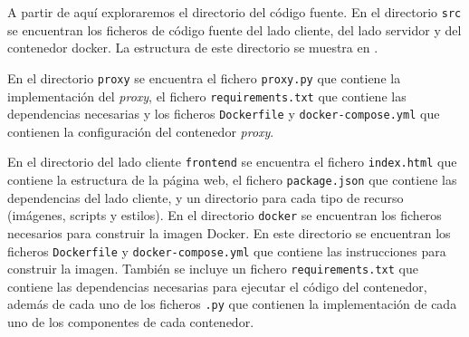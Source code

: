 A partir de aquí exploraremos el directorio del \gls{código fuente}. En el directorio \texttt{src} se encuentran los ficheros de \gls{código fuente} del lado cliente, del lado servidor y del \gls{contenedor} docker. La estructura de este directorio se muestra en .

\begin{figure}[htb]
    {
    \begin{tcolorbox}
    \end{tcolorbox}
    }
\end{figure}
En el directorio \texttt{proxy} se encuentra el fichero \texttt{proxy.py} que contiene la implementación del \textit{\gls{proxy}}, el fichero \texttt{requirements.txt} que contiene las dependencias necesarias y los ficheros \texttt{Dockerfile} y \texttt{docker-compose.yml} que contienen la configuración del \gls{contenedor} \textit{\gls{proxy}}.

En el directorio del lado cliente \texttt{frontend} se encuentra el fichero \texttt{index.html} que contiene la estructura de la página web, el fichero \texttt{package.json} que contiene las dependencias del lado cliente, y un directorio para cada tipo de recurso (imágenes, scripts y estilos). 
En el directorio \texttt{docker} se encuentran los ficheros necesarios para construir la \gls{imagen Docker}. En este directorio se encuentran los ficheros \texttt{Dockerfile} y \texttt{docker-compose.yml} que contiene las instrucciones para construir la imagen. También se incluye un fichero \texttt{requirements.txt} que contiene las dependencias necesarias para ejecutar el código del \gls{contenedor}, además de cada uno de los ficheros \texttt{.py} que contienen la implementación de cada uno de los componentes de cada \gls{contenedor}.  

